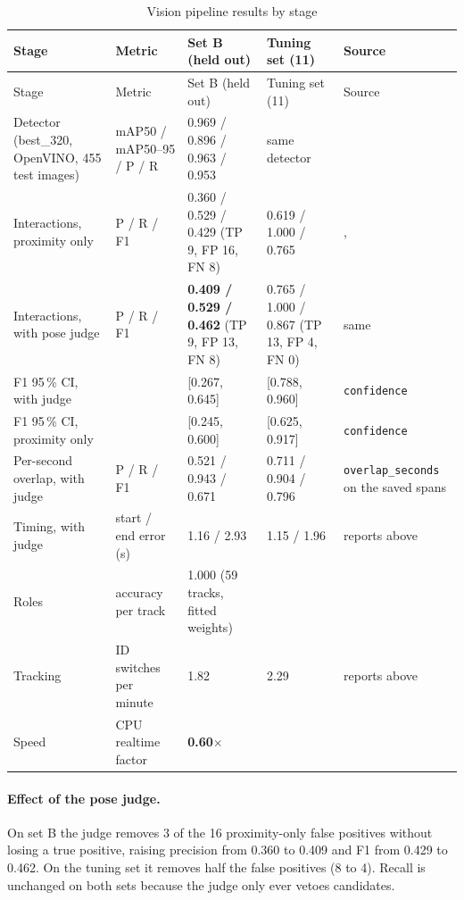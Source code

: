 \begin{longtable}{P{0.17\textwidth}P{0.15\textwidth}P{0.24\textwidth}P{0.2\textwidth}P{0.18\textwidth}}
\caption{Vision pipeline results by stage}\label{tab:cveval-stages}\\
\toprule
Stage & Metric & Set B (held out) & Tuning set (11) & Source\\
\midrule
\endfirsthead
\toprule
Stage & Metric & Set B (held out) & Tuning set (11) & Source\\
\midrule
\endhead
Detector (best\_320, OpenVINO, 455 test images) & mAP50 / mAP50--95 / P / R & 0.969 / 0.896 / 0.963 / 0.953 & same detector & \\
Interactions, proximity only & P / R / F1 & 0.360 / 0.529 / 0.429 (TP 9, FP 16, FN 8) & 0.619 / 1.000 / 0.765 & , \\
Interactions, with pose judge & P / R / F1 & \textbf{0.409 / 0.529 / 0.462} (TP 9, FP 13, FN 8) & 0.765 / 1.000 / 0.867 (TP 13, FP 4, FN 0) & same\\
F1 95\,\% CI, with judge & & [0.267, 0.645] & [0.788, 0.960] & \texttt{confidence}\\
F1 95\,\% CI, proximity only & & [0.245, 0.600] & [0.625, 0.917] & \texttt{confidence}\\
Per-second overlap, with judge & P / R / F1 & 0.521 / 0.943 / 0.671 & 0.711 / 0.904 / 0.796 & \texttt{overlap\_seconds} on the saved spans\\
Timing, with judge & start / end error (s) & 1.16 / 2.93 & 1.15 / 1.96 & reports above\\
Roles & accuracy per track & 1.000 (59 tracks, fitted weights) & & \\
Tracking & ID switches per minute & 1.82 & 2.29 & reports above\\
Speed & CPU realtime factor & \textbf{0.60$\times$} & & \\
\bottomrule
\end{longtable}

\paragraph{Effect of the pose judge.} On set B the judge removes 3 of the 16 proximity-only false positives without losing a true positive, raising precision from 0.360 to 0.409 and F1 from 0.429 to 0.462. On the tuning set it removes half the false positives (8 to 4). Recall is unchanged on both sets because the judge only ever vetoes candidates.

